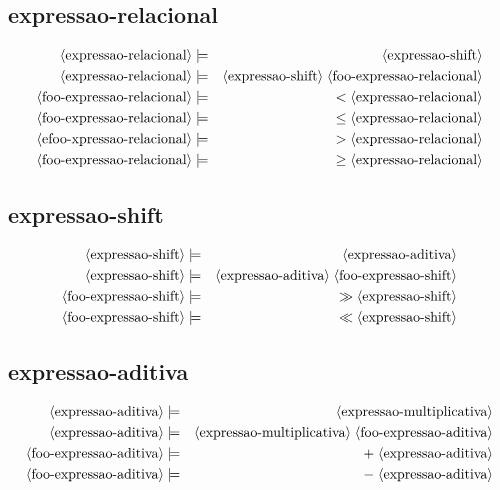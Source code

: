 \documentclass[12pt,a4papper]{article}
\newcommand{\pn}[1]{\langle \textnormal{#1} \rangle}
\newcommand{\pp}{\models}
\newcommand{\ww}{\;}
\newcommand{\sm}[1]{\textnormal{#1}}
\begin{document}
\begin{landscape}
\subsection{expressao-relacional}
\begin{eqnarray}
\pn{expressao-relacional} &\pp& \pn{expressao-shift} \\
\pn{expressao-relacional} &\pp& \pn{expressao-shift} \ww \pn{foo-expressao-relacional} \\
\pn{foo-expressao-relacional} &\pp& \sm{$<$} \ww \pn{expressao-relacional} \\
\pn{foo-expressao-relacional} &\pp& \sm{$\leq$} \ww \pn{expressao-relacional} \\
\pn{efoo-xpressao-relacional} &\pp& \sm{$>$} \ww \pn{expressao-relacional} \\
\pn{foo-expressao-relacional} &\pp& \sm{$\geq$} \ww \pn{expressao-relacional}
\end{eqnarray}

        
\subsection{expressao-shift}
\begin{eqnarray}
        \pn{expressao-shift} &\pp& \pn{expressao-aditiva} \\
        \pn{expressao-shift} &\pp& \pn{expressao-aditiva} \ww \pn{foo-expressao-shift} \\
    \pn{foo-expressao-shift} &\pp& \sm{$\gg$} \ww \pn{expressao-shift} \\
    \pn{foo-expressao-shift} &\pp& \sm{$\ll$} \ww \pn{expressao-shift}
\end{eqnarray}

       
\subsection{expressao-aditiva}
\begin{eqnarray}
        \pn{expressao-aditiva} &\pp& \pn{expressao-multiplicativa}\\
        \pn{expressao-aditiva} &\pp& \pn{expressao-multiplicativa} \ww \pn{foo-expressao-aditiva} \\
    \pn{foo-expressao-aditiva} &\pp& \sm{$+$} \ww \pn{expressao-aditiva} \\
    \pn{foo-expressao-aditiva} &\pp& \sm{$-$} \ww \pn{expressao-aditiva}
\end{eqnarray}


\end{landscape}
\end{document}
